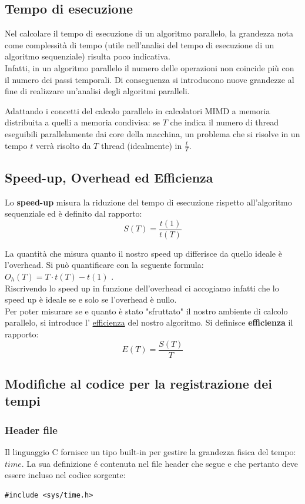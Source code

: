 \subsection{Tempo di esecuzione}

Nel calcolare il tempo di esecuzione di un algoritmo parallelo, la grandezza nota come complessità di tempo (utile nell'analisi del tempo di esecuzione di un algoritmo sequenziale) risulta poco indicativa.\\
Infatti, in un algoritmo parallelo il numero delle operazioni non coincide più con il numero dei passi temporali. Di conseguenza si introducono nuove grandezze al fine di realizzare un'analisi degli algoritmi paralleli.

Adattando i concetti del calcolo parallelo in calcolatori MIMD a memoria distribuita a quelli a memoria condivisa: se $T$ che indica il numero di thread eseguibili parallelamente dai core della macchina, un problema che si risolve in un tempo $t$ verrà risolto da $T$ thread (idealmente) in $\frac{t}{T}$.

\subsection{Speed-up, Overhead ed Efficienza}

Lo \textbf{speed-up} misura la riduzione del tempo di esecuzione rispetto all'algoritmo sequenziale ed è definito dal rapporto:
$$ S(T) = \frac{t(1)}{t(T)} $$ 

La quantità che misura quanto il nostro speed up differisce da quello ideale è l'overhead. Si può quantificare con la seguente formula: $O_h(T) = T\cdot t(T) - t(1)$ .\\
Riscrivendo lo speed up in funzione dell'overhead ci accogiamo infatti che lo speed up è ideale se e solo se l'overhead è nullo.\\

Per poter misurare se e quanto è stato "sfruttato" il nostro ambiente di calcolo parallelo, si introduce l' \underline{efficienza} del nostro algoritmo.
Si definisce \textbf{efficienza} il rapporto: $$ E(T) = \frac{S(T)}{T} $$

\subsection{Modifiche al codice per la registrazione dei tempi}
\subsubsection{Header file}
Il linguaggio C fornisce un tipo built-in per gestire la grandezza fisica del tempo: $time$.
La sua definizione é contenuta nel file header che segue e che pertanto deve essere incluso nel codice sorgente:
\begin{lstlisting}
#include <sys/time.h>
\end{lstlisting}


